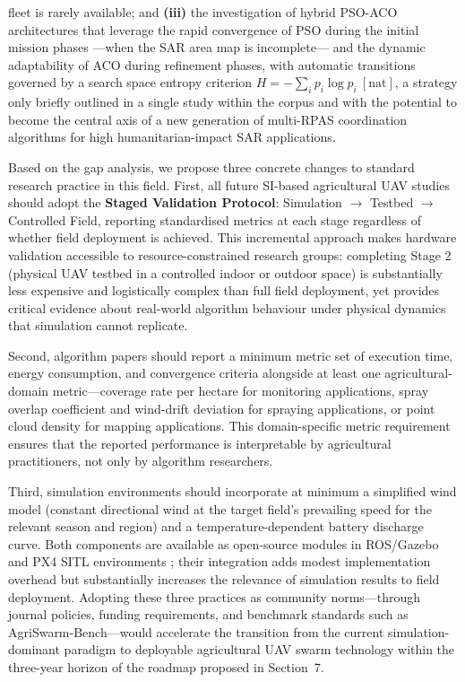 \documentclass[review,3p,times]{elsarticle}
\begin{document}
fleet is rarely available; and \textbf{(iii)} the investigation of hybrid PSO-ACO architectures that leverage the rapid convergence of PSO during the initial mission phases —when the SAR area map is incomplete— and the dynamic adaptability of ACO during refinement phases, with automatic transitions governed by a search space entropy criterion $H = -\sum_i p_i \log p_i\ [\text{nat}]$, a strategy only briefly outlined in a single study within the corpus \cite{wang2025} and with the potential to become the central axis of a new generation of multi-RPAS coordination algorithms for high humanitarian-impact SAR applications.

Based on the gap analysis, we propose three concrete changes to standard research practice in this field. First, all future SI-based agricultural UAV studies should adopt the \textbf{Staged Validation Protocol}: Simulation $\rightarrow$ Testbed $\rightarrow$ Controlled Field, reporting standardised metrics at each stage regardless of whether field deployment is achieved. This incremental approach makes hardware validation accessible to resource-constrained research groups: completing Stage 2 (physical UAV testbed in a controlled indoor or outdoor space) is substantially less expensive and logistically complex than full field deployment, yet provides critical evidence about real-world algorithm behaviour under physical dynamics that simulation cannot replicate.

Second, algorithm papers should report a minimum metric set of execution time, energy consumption, and convergence criteria alongside at least one agricultural-domain metric---coverage rate per hectare for monitoring applications, spray overlap coefficient and wind-drift deviation for spraying applications, or point cloud density for mapping applications. This domain-specific metric requirement ensures that the reported performance is interpretable by agricultural practitioners, not only by algorithm researchers.

Third, simulation environments should incorporate at minimum a simplified wind model (constant directional wind at the target field's prevailing speed for the relevant season and region) and a temperature-dependent battery discharge curve. Both components are available as open-source modules in ROS/Gazebo and PX4 SITL environments \cite{shafiq2022}; their integration adds modest implementation overhead but substantially increases the relevance of simulation results to field deployment. Adopting these three practices as community norms---through journal policies, funding requirements, and benchmark standards such as AgriSwarm-Bench---would accelerate the transition from the current simulation-dominant paradigm to deployable agricultural UAV swarm technology within the three-year horizon of the roadmap proposed in Section~7.
\end{document}
